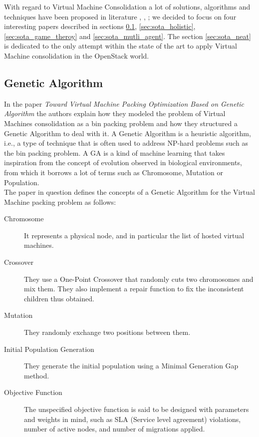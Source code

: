 With regard to Virtual Machine Consolidation a lot of solutions, algorithms and techniques have been proposed in literature \cite{He:2012jr}, \cite{Wuhib:2012vq}, \cite{Corradi:2014fe}; we decided to focus on four interesting papers described in sections \ref{sec:sota_ga}, \ref{sec:sota_holistic}, \ref{sec:sota_game_theroy} and \ref{sec:sota_mutli_agent}. The section \ref{sec:sota_neat} is dedicated to the only attempt within the state of the art to apply Virtual Machine consolidation in the OpenStack world.

\subsection{Genetic Algorithm}
\label{sec:sota_ga}
In the paper \textit{Toward Virtual Machine Packing Optimization Based on Genetic Algorithm}\cite{Nakada:2009in} the authors explain how they modeled the problem of Virtual Machines consolidation as a bin packing problem and how they structured a Genetic Algorithm to deal with it. A Genetic Algorithm is a heuristic algorithm, i.e., a type of technique that is often used to address NP-hard problems such as the bin packing problem. A GA is a kind of machine learning that takes inspiration from the concept of evolution observed in biological environments, from which it borrows a lot of terms such as Chromosome, Mutation or Population.\\
The paper in question defines the concepts of a Genetic Algorithm for the Virtual Machine packing problem as follows:
\begin{description}
  \item[Chromosome] It represents a physical node, and in particular the list of hosted virtual machines.
  \item[Crossover] They use a One-Point Crossover that randomly cuts two chromosomes and mix them. They also implement a repair function to fix the inconsistent children thus obtained.
  \item[Mutation] They randomly exchange two positions between them.
  \item[Initial Population Generation] They generate the initial population using a Minimal Generation Gap method.
  \item[Objective Function] The unspecified objective function is said to be designed with parameters and weights in mind, such as SLA (Service level agreement) violations, number of active nodes, and number of migrations applied.
\end{description}

